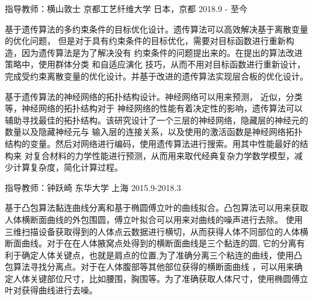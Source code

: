 

\begin{cventries}

  \cventry
    {指导教师：横山敦士} %
    {京都工艺纤维大学} %
    {日本，京都} %
    {2018.9 - 至今} %
    {
      \begin{cvitems} %
        \item {基于遗传算法的多约束条件的目标优化设计。遗传算法可以高效解决基于离散变量的优化问题，
	但是对于具有约束条件的目标优化，需要对目标函数进行重新构造，因为遗传算法是为了解决没有
	约束条件的问题提出来的。在提出的算法改进策略中，使用群体分类
	和自适应演化 
	技巧，从而不用对目标函数进行重新设计，完成受约束离散变量的优化设计。并基于改进的遗传算法实现层合板的优化设计。}
        \item {
基于遗传算法的神经网络的拓扑结构设计。神经网络可以用来预测，
近似，分类等，神经网络的拓扑结构对于
神经网络的性能有着决定性的影响，遗传算法可以辅助寻找最佳的拓扑结构。该研究设计了一个三层的神经网络，隐藏层的神经元的数量以及隐藏神经元与
输入层的连接关系，以及使用的激活函数是神经网络拓扑结构的变量。然后对网络进行编码，使用遗传算法进行搜索。用其中性能最好的结构来
对复合材料的力学性能进行预测，从而用来取代经典复杂力学数学模型，减少计算复杂度，简化计算过程。}
      \end{cvitems}
    }

  \cventry
    {指导教师：钟跃崎} %
    {东华大学} %
    {上海} %
    {2015.9-2018.3} %
    {
      \begin{cvitems} %
        \item
			{基于凸包算法黏连曲线分离和基于椭圆傅立叶的曲线拟合。凸包算法可以用来获取人体横断面曲线的外包围圆，傅立叶拟合可以用来对曲线的噪声进行去除。
			使用三维扫描设备获取得到的人体点云数据进行横切，从而获得人体不同部位的人体横断面曲线。对于在在人体腋窝点处得到的横断面曲线是三个黏连的圆,
			它的分离有利于确定人体关键点，也就是肩点的位置,为了准确分离三个粘连的曲线，使用凸包算法寻找分离点。对于在人体腹部等其他部位获得的横断面曲线
			，可以用来确定人体关键部位尺寸，比如腰围，胸围等。为了准确获取人体尺寸，使用椭圆傅立叶对获得曲线进行去噪。
}
      \end{cvitems}
    }


\end{cventries}
